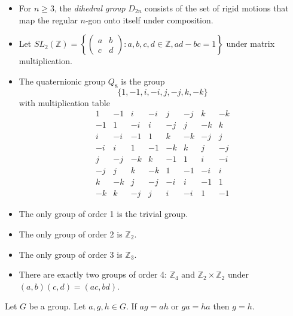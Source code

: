 \begin{ex}
\begin{itemize}
        \item For $n \geq 3$, the \emph{dihedral group} $D_{2n}$ consists of the set of rigid
              motions that map the regular $n$-gon onto itself under composition.
              \item Let $SL_2(\mathbb{Z}) = \left\{ \left( \begin{array}{cc}
              a & b \\
              c & d \end{array} \right)
              : a,b,c,d \in \mathbb{Z}, ad - bc = 1 \right\}$ under matrix multiplication.
\item The quaternionic group $Q_8$ is the group
\[ \{ 1, -1, i, -i, j, -j, k, -k \} \]
with multiplication table
\[ \begin{array}{cccccccc}
1 & -1 & i & -i & j & -j & k & -k \\
-1 & 1 & -i & i & -j & j & -k & k \\
i & -i & -1 & 1 & k & -k & -j & j \\
-i & i & 1 & -1 & -k & k & j & -j \\
j & -j & -k & k & -1 & 1 & i & -i \\
-j & j & k & -k & 1 & -1 & -i & i \\
k & -k & j & -j & -i & i & -1 & 1 \\
-k & k & -j & j & i & -i & 1 & -1
\end{array} \]
    \end{itemize}
\end{ex}

\begin{ex}
    \begin{itemize}
        \item The only group of order 1 is the trivial group.
        \item The only group of order 2 is $\mathbb{Z}_2$.
        \item The only group of order 3 is $\mathbb{Z}_3$.
        \item There are exactly two groups of order 4: $\mathbb{Z}_4$ and $\mathbb{Z}_2
                  \times \mathbb{Z}_2$ under $(a,b) (c,d) = (ac,bd)$.
    \end{itemize}
\end{ex}

\begin{prop}[Cancellation]
    Let $G$ be a group. Let $a,g,h \in G$. If $ag = ah$ or $ga = ha$ then $g = h$.
\end{prop}


